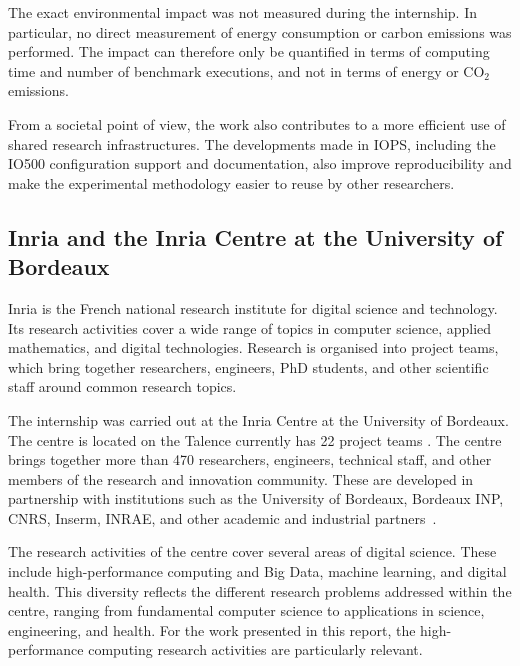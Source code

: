 The exact environmental impact was not measured during the internship.
In particular, no direct measurement of energy consumption or carbon
emissions was performed. The impact can therefore only be quantified in
terms of computing time and number of benchmark executions, and not in
terms of energy or CO$_2$ emissions.

From a societal point of view, the work also contributes to a more
efficient use of shared research infrastructures. The developments made
in IOPS, including the IO500 configuration support and documentation,
also improve reproducibility and make the experimental methodology easier
to reuse by other researchers.
\subsection{Inria and the Inria Centre at the University of Bordeaux}

Inria is the French national research institute for digital science and
technology. Its research activities cover a wide range of topics in
computer science, applied mathematics, and digital technologies. Research
is organised into project teams, which bring together researchers,
engineers, PhD students, and other scientific staff around common research
topics.

The internship was carried out at the Inria Centre at the University of
Bordeaux. The centre is located on the Talence 
currently has 22 project teams . The centre brings together
more than 470 researchers, engineers, technical staff, and other members
of the research and innovation community. These  are developed in
partnership with institutions such as the University of Bordeaux,
Bordeaux INP, CNRS, Inserm, INRAE, and other academic and industrial
partners~\cite{inria_bordeaux}.

The research activities of the centre cover several areas of digital
science. These include high-performance computing and Big Data, machine
learning, and digital health. This diversity reflects the different
research problems addressed within the centre, ranging from fundamental
computer science to applications in science, engineering, and health.
For the work presented in this report, the high-performance computing
research activities are particularly relevant.

